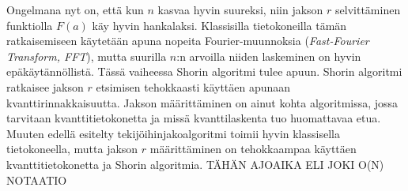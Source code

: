Ongelmana nyt on, että kun $n$ kasvaa hyvin suureksi, niin jakson $r$ selvittäminen funktiolla $F(a)$ käy hyvin hankalaksi. Klassisilla tietokoneilla tämän ratkaisemiseen käytetään apuna nopeita Fourier-muunnoksia (\emph{Fast-Fourier Transform, FFT}), mutta suurilla $n$:n arvoilla niiden laskeminen on hyvin epäkäytännöllistä. Tässä vaiheessa Shorin algoritmi tulee apuun. Shorin algoritmi ratkaisee jakson $r$ etsimisen tehokkaasti käyttäen apunaan kvanttirinnakkaisuutta. Jakson määrittäminen on ainut kohta algoritmissa, jossa tarvitaan kvanttitietokonetta ja missä kvanttilaskenta tuo huomattavaa etua. Muuten edellä esitelty tekijöihinjakoalgoritmi toimii hyvin klassisella tietokoneella, mutta jakson $r$ määrittäminen on tehokkaampaa käyttäen kvanttitietokonetta ja Shorin algoritmia. TÄHÄN AJOAIKA ELI JOKI O(N) NOTAATIO